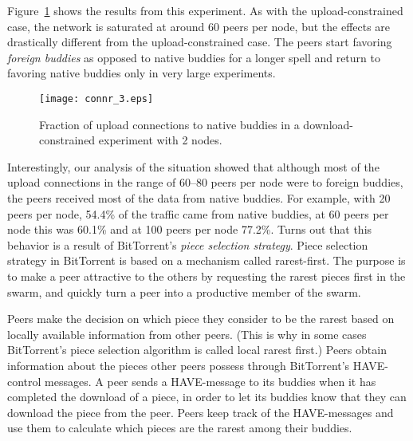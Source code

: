 \documentclass[10pt,letterpaper,twocolumn]{article}
\begin{document}
Figure~\ref{connr_3} shows the results from this experiment. As with
the upload-constrained case, the network is saturated at around 60
peers per node, but the effects are drastically different from the
upload-constrained case. The peers start favoring \textit{foreign
  buddies} as opposed to native buddies for a longer spell and return
to favoring native buddies only in very large experiments.



\begin{figure}[!tb]
\begin{center}
\texttt{[image: connr\_3.eps]}
\caption{Fraction of upload connections to native buddies in a
  download-constrained experiment with 2 nodes.}
\label{connr_3}
\end{center}
\end{figure}





Interestingly, our analysis of the situation showed that although most
of the upload connections in the range of 60--80 peers per node were
to foreign buddies, the peers received most of the data from native
buddies. For example, with 20 peers per node, 54.4\% of the traffic
came from native buddies, at 60 peers per node this was 60.1\% and at
100 peers per node 77.2\%. Turns out that this behavior is a result of
BitTorrent's \textit{piece selection strategy}. Piece selection
strategy in BitTorrent is based on a mechanism called
rarest-first. The purpose is to make a peer attractive to the others
by requesting the rarest pieces first in the swarm, and quickly turn a
peer into a productive member of the swarm.




Peers make the decision on which piece they consider to be the rarest
based on locally available information from other peers. (This is why
in some cases BitTorrent's piece selection algorithm is called local
rarest first.) Peers obtain information about the pieces other peers
possess through BitTorrent's HAVE-control messages. A peer sends a
HAVE-message to its buddies when it has completed the download of a
piece, in order to let its buddies know that they can download the
piece from the peer. Peers keep track of the HAVE-messages and use
them to calculate which pieces are the rarest among their buddies.
\end{document}
